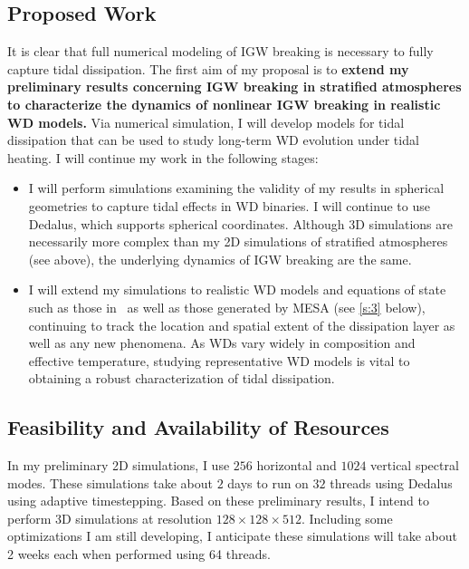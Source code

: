 \documentclass[12pt,
        usenames, %
        dvipsnames %
    ]{article}
\begin{document}
\subsection{Proposed Work}

It is clear that full numerical modeling of IGW breaking is necessary to fully
capture tidal dissipation. The first aim of my proposal is to \textbf{extend my
preliminary results concerning IGW breaking in stratified atmospheres to
characterize the dynamics of nonlinear IGW breaking in realistic WD models.} Via
numerical simulation, I will develop models for tidal dissipation that can be
used to study long-term WD evolution under tidal heating. I will continue my
work in the following stages:
\begin{itemize}
    \item I will perform simulations examining the validity of my results in
        spherical geometries to capture tidal effects in WD binaries. I will
        continue to use Dedalus, which supports spherical coordinates. Although
        3D simulations are necessarily more complex than my 2D simulations of
        stratified atmospheres (see above), the underlying dynamics of IGW
        breaking are the same.

    \item I will extend my simulations to realistic WD models and equations of
        state such as those in~\cite{brassard1992} as well as those generated by
        MESA\cite{MESA} (see \autoref{s:3} below), continuing to track the
        location and spatial extent of the dissipation layer as well as any new
        phenomena. As WDs vary widely in composition and effective temperature,
        studying representative WD models is vital to obtaining a robust
        characterization of tidal dissipation.
\end{itemize}

\subsection{Feasibility and Availability of Resources}

In my preliminary 2D simulations, I use $256$ horizontal and $1024$ vertical
spectral modes. These simulations take about $2$ days to run on $32$ threads using
Dedalus\cite{dedalus} using adaptive timestepping. Based on these preliminary
results, I intend to perform 3D simulations at resolution $128 \times 128 \times
512$. Including some optimizations I am still developing, I anticipate these
simulations will take about 2 weeks each when performed using 64 threads.
\end{document}
